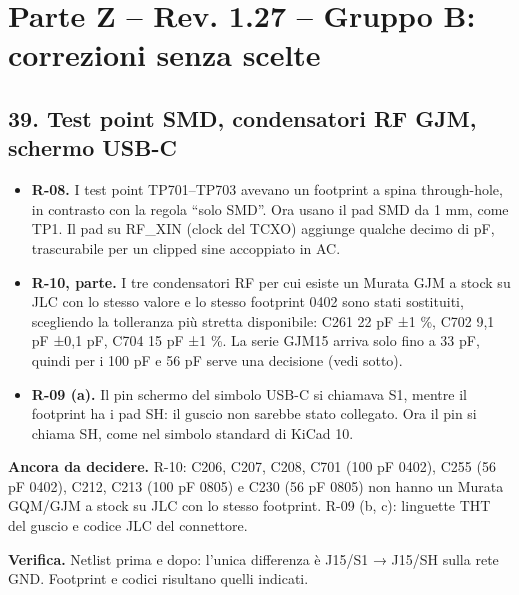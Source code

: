 \clearpage
\section[Parte Z – Rev. 1.27 – Gruppo B: correzioni senza scelte]{Parte Z – Rev. 1.27 – Gruppo B: correzioni senza scelte}

\subsection[39. Test point SMD, condensatori RF GJM, schermo USB-C]{39. Test point SMD, condensatori RF GJM, schermo USB-C}

\begin{itemize}
\item \textbf{R-08.} I test point TP701–TP703 avevano un footprint a spina through-hole, in contrasto con la regola \textquotedblleft{}solo SMD\textquotedblright{}. Ora usano il pad SMD da 1 mm, come TP1. Il pad su RF\_\allowbreak{}XIN (clock del TCXO) aggiunge qualche decimo di pF, trascurabile per un clipped sine accoppiato in AC.
\item \textbf{R-10, parte.} I tre condensatori RF per cui esiste un Murata GJM a stock su JLC con lo stesso valore e lo stesso footprint 0402 sono stati sostituiti, scegliendo la tolleranza più stretta disponibile: C261 22 pF ±1 \%, C702 9,1 pF ±0,1 pF, C704 15 pF ±1 \%. La serie GJM15 arriva solo fino a 33 pF, quindi per i 100 pF e 56 pF serve una decisione (vedi sotto).
\item \textbf{R-09 (a).} Il pin schermo del simbolo USB-C si chiamava S1, mentre il footprint ha i pad SH: il guscio non sarebbe stato collegato. Ora il pin si chiama SH, come nel simbolo standard di KiCad 10.
\end{itemize}

\textbf{Ancora da decidere.} R-10: C206, C207, C208, C701 (100 pF 0402), C255 (56 pF 0402), C212, C213 (100 pF 0805) e C230 (56 pF 0805) non hanno un Murata GQM/\allowbreak{}GJM a stock su JLC con lo stesso footprint. R-09 (b, c): linguette THT del guscio e codice JLC del connettore.

\textbf{Verifica.} Netlist prima e dopo: l'unica differenza è J15/\allowbreak{}S1 → J15/\allowbreak{}SH sulla rete GND. Footprint e codici risultano quelli indicati.
